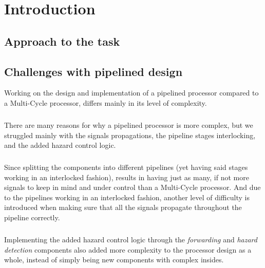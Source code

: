 \chapter{Introduction}


\section{Approach to the task}\label{intro:approach}


\section{Challenges with pipelined design}

Working on the design and implementation of a pipelined processor compared to a
Multi-Cycle processor, differs mainly in its level of complexity.
\paragraph*{}
There are many reasons for why a pipelined processor is more complex, but we
struggled mainly with the signals propagations, the pipeline stages
interlocking, and the added hazard control logic.
\paragraph*{}
Since splitting the components into different pipelines (yet having said stages
working in an interlocked fashion), results in having just as many, if not more
signals to keep in mind and under control than a Multi-Cycle processor. And due
to the pipelines working in an interlocked fashion, another level of difficulty
is introduced when making sure that all the signals propagate throughout the
pipeline correctly.
\paragraph*{}
Implementing the added hazard control logic through the \emph{forwarding} and
\emph{hazard detection} components also added more complexity to the processor
design as a whole, instead of simply being new components with complex insides.
